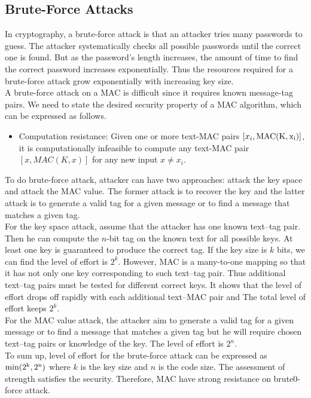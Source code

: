 \documentclass[12pt,a4paper,oneside]{report}
\begin{document}
\subsection{Brute-Force Attacks}
In cryptography, a brute-force attack is that an attacker tries many passwords to guess. The attacker systematically checks all possible passwords until the correct one is found. But as the password’s length increases, the amount of time to find the correct password increases exponentially. Thus the resources required for a brute-force attack grow exponentially with increasing key size.\\

A brute-force attack on a MAC is difficult since it requires known message-tag pairs. We need to state the desired security property of a MAC algorithm, which can be expressed as follows.
\begin{itemize}
    \item Computation resistance: Given one or more text-MAC pairs $[x_i,\rm{MAC}(K,x_i)]$,
it is computationally infeasible to compute any text-MAC pair $[x, MAC(K, x)]$ for any new input $x \neq x_i$.
\end{itemize}

To do brute-force attack, attacker can have two approaches: attack the key space and
attack the MAC value. The former attack is to recover the key and the latter attack is to generate a valid tag for a given message or to find a message that matches a given tag.\\

For the key space attack, assume that the attacker has one known text–tag pair. Then he can compute the $n$-bit tag on the known text for all possible keys. At least one key is guaranteed to produce the correct tag. If the key size is $k$ bits, we can find the level of effort is $2^k$. However, MAC is a many-to-one mapping so that it has not only one key corresponding to such text–tag pair. Thus additional text–tag pairs must be tested for different correct keys. It shows that the level of effort drops off rapidly with each additional text–MAC pair and The total level of effort keeps $2^k$.\\

For the MAC value attack, the attacker aim to generate a valid tag for a given message or to find a message that matches a given tag but he will require chosen text–tag pairs or knowledge of the key. The level of effort is $2^n$.\\

To sum up, level of effort for the brute-force attack can be expressed as $\rm{min}(2^k,2^n)$ where $k$ is the key size and $n$ is the code size. The assessment of strength satisfies the security. Therefore, MAC have strong resistance on brute0-force attack.\\
\end{document}
